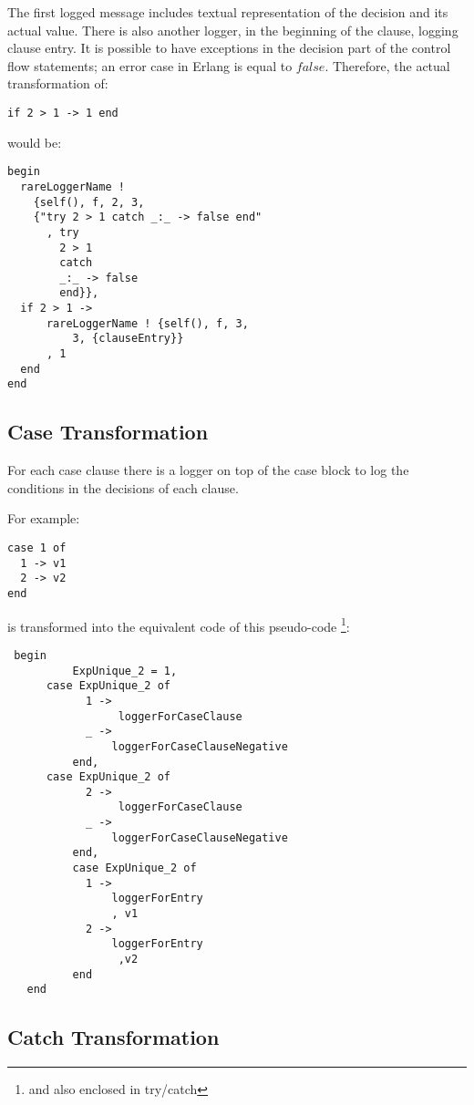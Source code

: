 \documentclass[12pt,a4paper]{report}
\begin{document}
The first logged message includes textual representation of the decision and its actual value. There is also another logger, in the beginning of the clause, logging clause entry. It is possible to have exceptions in the decision part of the control flow statements; an error case in Erlang is equal to $false$. Therefore, the actual transformation of:

\begin{lstlisting}
if 2 > 1 -> 1 end
\end{lstlisting}

would be:

\begin{lstlisting}
begin
  rareLoggerName !
    {self(), f, 2, 3,
	{"try 2 > 1 catch _:_ -> false end"
	  , try 	
		2 > 1 
	    catch 
		_:_ -> false 
	    end}},
  if 2 > 1 ->
      rareLoggerName ! {self(), f, 3,
	      3, {clauseEntry}}
      , 1
  end
end 
\end{lstlisting}

\subsection{Case Transformation}
For each case clause there is a logger on top of the case block to log the conditions in the decisions of each clause.
 
For example:
\begin{lstlisting}
case 1 of 
  1 -> v1
  2 -> v2
end 
\end{lstlisting}

is transformed into the equivalent code of this pseudo-code \footnote{and also enclosed in try/catch}:
\begin{lstlisting}
 begin
          ExpUnique_2 = 1,
	  case ExpUnique_2 of
            1 ->
                 loggerForCaseClause
            _ ->
                loggerForCaseClauseNegative
          end,
	  case ExpUnique_2 of
            2 ->
                 loggerForCaseClause
            _ ->
                loggerForCaseClauseNegative
          end,
          case ExpUnique_2 of
            1 ->
                loggerForEntry
                , v1
            2 ->
                loggerForEntry
                 ,v2  
          end
   end
\end{lstlisting}  

\subsection{Catch Transformation}
\end{document}
